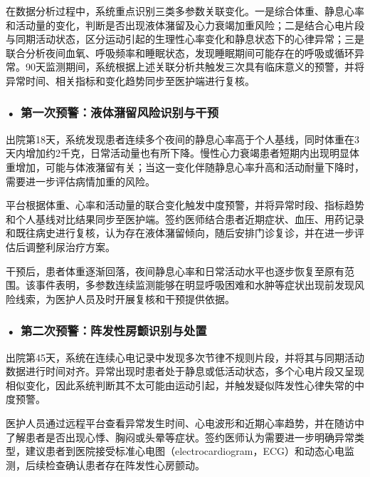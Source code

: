 \par
\noindent\begin{minipage}{\textwidth}
\centering
{}
\label{fig:ch10_14}
\end{minipage}
\par

在数据分析过程中，系统重点识别三类多参数关联变化。一是综合体重、静息心率和活动量的变化，判断是否出现液体潴留及心力衰竭加重风险；二是结合心电片段与同期活动状态，区分运动引起的生理性心率变化和静息状态下的心律异常；三是联合分析夜间血氧、呼吸频率和睡眠状态，发现睡眠期间可能存在的呼吸或循环异常。90天监测期间，系统根据上述关联分析共触发三次具有临床意义的预警，并将异常时间、相关指标和变化趋势同步至医护端进行复核。
\subsubsection*{\textbf{• 第一次预警：液体潴留风险识别与干预}}

出院第18天，系统发现患者连续多个夜间的静息心率高于个人基线，同时体重在3天内增加约2千克，日常活动量也有所下降。慢性心力衰竭患者短期内出现明显体重增加，可能与体液潴留有关；当这一变化伴随静息心率升高和活动耐量下降时，需要进一步评估病情加重的风险。

平台根据体重、心率和活动量的联合变化触发中度预警，并将异常时段、指标趋势和个人基线对比结果同步至医护端。签约医师结合患者近期症状、血压、用药记录和既往病史进行复核，认为存在液体潴留倾向，随后安排门诊复诊，并在进一步评估后调整利尿治疗方案。

干预后，患者体重逐渐回落，夜间静息心率和日常活动水平也逐步恢复至原有范围。该事件表明，多参数连续监测能够在明显呼吸困难和水肿等症状出现前发现风险线索，为医护人员及时开展复核和干预提供依据。

\subsubsection*{\textbf{• 第二次预警：阵发性房颤识别与处置}}

出院第45天，系统在连续心电记录中发现多次节律不规则片段，并将其与同期活动数据进行时间对齐。异常出现时患者处于静息或低活动状态，多个心电片段又呈现相似变化，因此系统判断其不太可能由运动引起，并触发疑似阵发性心律失常的中度预警。

医护人员通过远程平台查看异常发生时间、心电波形和近期心率趋势，并在随访中了解患者是否出现心悸、胸闷或头晕等症状。签约医师认为需要进一步明确异常类型，建议患者到医院接受标准心电图（electrocardiogram，ECG）和动态心电监测，后续检查确认患者存在阵发性心房颤动。

